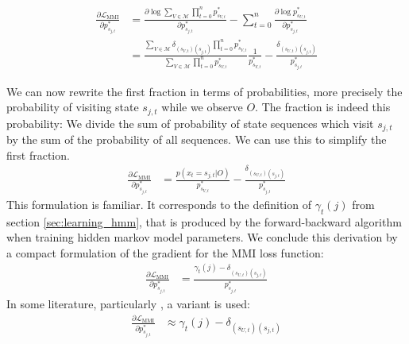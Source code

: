 \begin{align*}
\frac{\partial\mathcal{L}_{\text{MMI}}}{\partial p^*_{s_{j,t}}} &= \frac{\partial \log \sum_{V \in \mathcal{M}} \prod_{t = 0}^{n} p^*_{s_{V,t}}}{\partial p^*_{s_{j,t}}} - \sum_{t = 0}^{n} \frac{\partial \log p^*_{s_{U,t}}}{\partial p^*_{s_{j,t}}} \\
&= \frac{ \sum_{V \in \mathcal{M}} \delta_{(s_{V,t})(s_{j,t})} \prod_{t = 0}^{n} p^*_{s_{V,t}}}{\sum_{V \in \mathcal{M}} \prod_{t = 0}^{n} p^*_{s_{V,t}}}\frac{1}{p^*_{s_{V,t}}} - \frac{\delta_{(s_{U,t})(s_{j,t})}}{p^*_{s_{j,t}}}
\end{align*}

We can now rewrite the first fraction in terms of probabilities, more precisely the probability of visiting state $s_{j,t}$ while we observe $O$. The fraction is indeed this probability: We divide the sum of probability of state sequences which visit $s_{j,t}$ by the sum of the probability of all sequences. We can use this to simplify the first fraction.
\begin{align*}
\frac{\partial\mathcal{L}_{\text{MMI}}}{\partial p^*_{s_{j,t}}} &= \frac{p(x_t = s_{j,t}|O)}{p^*_{s_{V,t}}} - \frac{\delta_{(s_{U,t})(s_{j,t})}}{p^*_{s_{j,t}}}
\end{align*}
This formulation is familiar. It corresponds to the definition of $\gamma_t(j)$ from section \ref{sec:learning_hmm}, that is produced by the forward-backward algorithm when training hidden markov model parameters. We conclude this derivation by a compact formulation of the gradient for the MMI loss function:
\begin{align}
\label{eq:mmi_grad}
\frac{\partial\mathcal{L}_{\text{MMI}}}{\partial p^*_{s_{j,t}}} &=  \frac{\gamma_t(j) -\delta_{(s_{U,t})(s_{j,t})}}{p^*_{s_{j,t}}}
\end{align} 
In some literature, particularly \cite{ghoshal2013sequence}, a variant is used: 
\begin{align}
\label{eq:mmi_grad_simple}
\frac{\partial\mathcal{L}_{\text{MMI}}}{\partial p^*_{s_{j,t}}} &\approx \gamma_t(j) - \delta_{(s_{U,t})(s_{j,t})}
\end{align}

